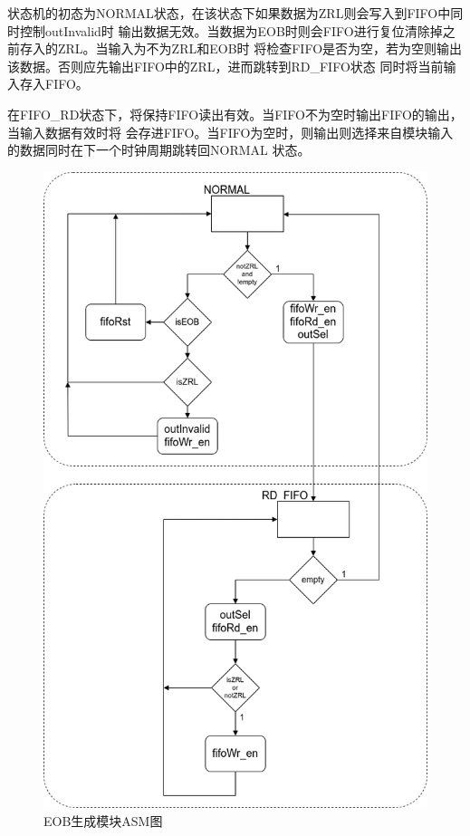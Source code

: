 \documentclass{article}
\numberwithin {equation}{section}
\begin{document}
\begin{spacing}{1.25}
      状态机的初态为NORMAL状态，在该状态下如果数据为ZRL则会写入到FIFO中同时控制outInvalid时
      输出数据无效。当数据为EOB时则会FIFO进行复位清除掉之前存入的ZRL。当输入为不为ZRL和EOB时
      将检查FIFO是否为空，若为空则输出该数据。否则应先输出FIFO中的ZRL，进而跳转到RD\_FIFO状态
      同时将当前输入存入FIFO。

      在FIFO\_RD状态下，将保持FIFO读出有效。当FIFO不为空时输出FIFO的输出，当输入数据有效时将 
      会存进FIFO。当FIFO为空时，则输出则选择来自模块输入的数据同时在下一个时钟周期跳转回NORMAL
      状态。

      \begin{figure}[H]
        \centering
        \includegraphics[scale=0.4]{./pictures/EOBGenASM.png}
        \caption{EOB生成模块ASM图}
        \label{EOBGenASM}
      \end{figure}


\end{spacing}
\end{document}
